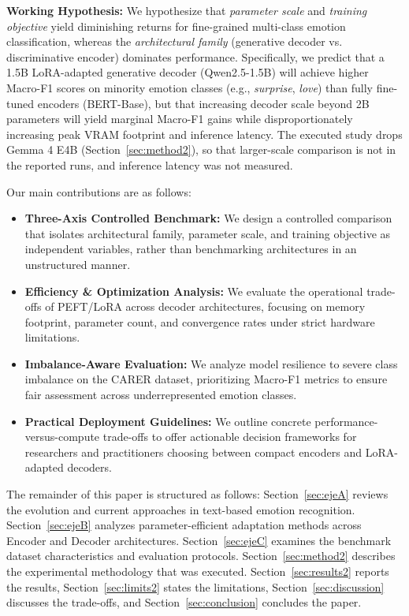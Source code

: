 \documentclass[conference]{IEEEtran}
\begin{document}
\textbf{Working Hypothesis:} We hypothesize that \textit{parameter scale} and \textit{training objective} yield diminishing returns for 
fine-grained multi-class emotion classification, whereas the \textit{architectural family} (generative decoder vs. discriminative encoder) 
dominates performance. Specifically, we predict that a 1.5B LoRA-adapted generative decoder (Qwen2.5-1.5B) will achieve higher Macro-F1 scores 
on minority emotion classes (e.g., \textit{surprise}, \textit{love}) than fully fine-tuned encoders (BERT-Base), but that increasing decoder scale 
beyond 2B parameters will yield marginal Macro-F1 gains while disproportionately increasing peak VRAM footprint and inference latency. The executed study drops Gemma 4 E4B (Section~\ref{sec:method2}), so that larger-scale comparison is not in the reported runs, and inference latency was not measured.

Our main contributions are as follows:
\begin{itemize}
    \item \textbf{Three-Axis Controlled Benchmark:} We design a controlled comparison that isolates architectural family, parameter scale, and training objective as independent variables, rather than benchmarking architectures in an unstructured manner.
    \item \textbf{Efficiency \& Optimization Analysis:} We evaluate the operational trade-offs of PEFT/LoRA across decoder architectures, focusing on memory footprint, parameter count, and convergence rates under strict hardware limitations.
    \item \textbf{Imbalance-Aware Evaluation:} We analyze model resilience to severe class imbalance on the CARER dataset, prioritizing Macro-F1 metrics to ensure fair assessment across underrepresented emotion classes.
    \item \textbf{Practical Deployment Guidelines:} We outline concrete performance-versus-compute trade-offs to offer actionable decision frameworks for researchers and practitioners choosing between compact encoders and LoRA-adapted decoders.
\end{itemize}

The remainder of this paper is structured as follows: Section~\ref{sec:ejeA} reviews the evolution and current approaches in text-based emotion recognition. Section~\ref{sec:ejeB} analyzes parameter-efficient adaptation methods across Encoder and Decoder architectures. Section~\ref{sec:ejeC} examines the benchmark dataset characteristics and evaluation protocols. Section~\ref{sec:method2} describes the experimental methodology that was executed. Section~\ref{sec:results2} reports the results, Section~\ref{sec:limits2} states the limitations, Section~\ref{sec:discussion} discusses the trade-offs, and Section~\ref{sec:conclusion} concludes the paper.
\end{document}
